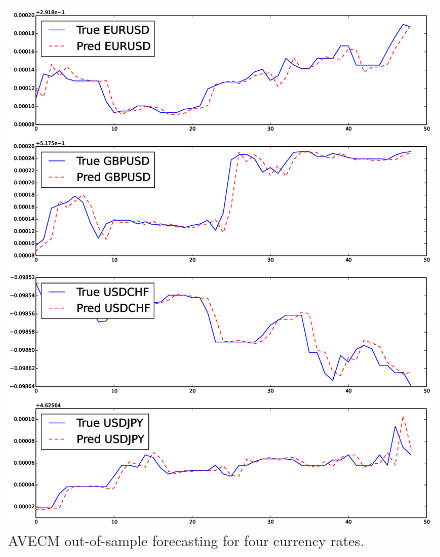 \begin{figure}[!h]
  \centering
  \includegraphics[width=\textwidth]{img/accuracy}
  \caption{AVECM out-of-sample forecasting for four currency rates.}
  \label{fig:accuracy}
\end{figure}


